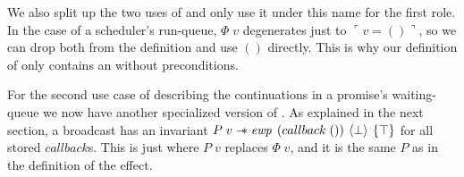 We also split up the two uses of \gsReady{} and only use it under this name for the first role.
In the case of a scheduler's run-queue, \(Φ\; v\) degenerates just to \(\ulcorner v = () \urcorner\), so we can drop both from the definition and use \(()\) directly.
This is why our definition of \gsReady{} only contains an \ewpt{} without preconditions.

For the second use case of describing the continuations in a promise's waiting-queue we now have another specialized version of \gsReady{}.
As explained in the next section, a broadcast has an invariant \(P\; v \wand \ewp{callback\; ()}{\bot}{\top}\) for all stored \(callback\)s.
This is just \gsReady{} where \(P\; v\) replaces \(Φ\; v\), and it is the same \(P\) as in the definition of the \esuspend{} effect.

